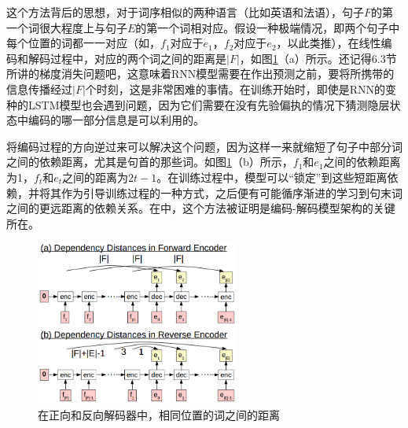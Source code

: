 \documentclass[10pt,a4paper]{ctexart}
\begin{document}
这个方法背后的思想，对于词序相似的两种语言（比如英语和法语），句子$F$的第一个词很大程度上与句子$E$的第一个词相对应。假设一种极端情况，即两个句子中每个位置的词都一一对应（如，$f_1$对应于$e_1$，$f_2$对应于$e_2$，以此类推），在线性编码和解码过程中，对应的两个词之间的距离是$|F|$，如图\ref{fig:24}（a）所示。还记得6.3节所讲的梯度消失问题吧，这意味着RNN模型需要在作出预测之前，要将所携带的信息传播经过$|F|$个时刻，这是非常困难的事情。在训练开始时，即使是RNN的变种的LSTM模型也会遇到问题，因为它们需要在没有先验偏执的情况下猜测隐层状态中编码的哪一部分信息是可以利用的。

将编码过程的方向逆过来可以解决这个问题，因为这样一来就缩短了句子中部分词之间的依赖距离，尤其是句首的那些词。如图\ref{fig:24}（b）所示，$f_1$和$e_1$之间的依赖距离为1，$f_t$和$e_t$之间的距离为$2t-1$。在训练过程中，模型可以“锁定”到这些短距离依赖，并将其作为引导训练过程的一种方式，之后便有可能循序渐进的学习到句末词之间的更远距离的依赖关系。在\cite{sutskever2014sequence}中，这个方法被证明是编码-解码模型架构的关键所在。

\begin{figure}[H]
\centering
\includegraphics[width=0.6\textwidth]{fig24.png}
\caption{在正向和反向解码器中，相同位置的词之间的距离}
\label{fig:24}
\end{figure}
\end{document}
